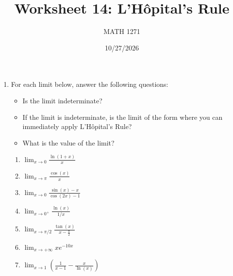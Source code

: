 \documentclass[12pt]{exam}
\title{Worksheet 14: L'Hôpital's Rule}
\author{MATH 1271}
\date{10/27/2026}
\begin{document}
\newpage
\maketitle

\begin{enumerate}

\item For each limit below, answer the following questions:

\begin{itemize}
	\item Is the limit indeterminate?
	\item If the limit is indeterminate, is the limit of the form where you can immediately apply L'H\^opital's Rule?
	\item What is the value of the limit?
\end{itemize}	

\smallskip

\begin{enumerate}

\item $\displaystyle\lim_{x\to 0}\frac{\ln(1+x)}{x}$

\vfill

\item $\displaystyle\lim_{x\to \pi}\frac{\cos(x)}{x}$

\vfill

\item $\displaystyle\lim_{x\to0}\frac{\sin(x)-x}{\cos(2x)-1}$

\vfill

\item $\displaystyle\lim_{x\to 0^+} \frac{\ln(x)}{1/x}$

\vfill

\newpage

\item $\displaystyle\lim_{x\to \pi/2}\frac{\tan(x)}{x-\frac{\pi}{2}}$

\vspace{2.1in}

\item $\displaystyle\lim_{x\to +\infty}xe^{-10x}$

\vspace{2.1in}

\item $\displaystyle\lim_{x\to 1}\left(\frac{1}{x-1}-\frac{x}{\ln(x)}\right)$

\vfill

\end{enumerate}


\end{enumerate}
\end{document}
